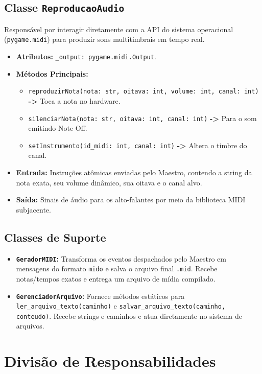 \documentclass[12pt, a4paper]{article}
\begin{document}
\subsection{Classe \texttt{ReproducaoAudio}}
Responsável por interagir diretamente com a API do sistema operacional (\texttt{pygame.midi}) para produzir sons multitimbrais em tempo real.
\begin{itemize}[leftmargin=2cm]
  \item \textbf{Atributos:} \texttt{\_output: pygame.midi.Output}.
  \item \textbf{Métodos Principais:}
    \begin{itemize}
      \item \texttt{reproduzirNota(nota: str, oitava: int, volume: int, canal: int)} \textbf{->} Toca a nota no hardware.
      \item \texttt{silenciarNota(nota: str, oitava: int, canal: int)} \textbf{->} Para o som emitindo Note Off.
      \item \texttt{setInstrumento(id\_midi: int, canal: int)} \textbf{->} Altera o timbre do canal.
    \end{itemize}
  \item \textbf{Entrada:} Instruções atômicas enviadas pelo Maestro, contendo a string da nota exata, seu volume dinâmico, sua oitava e o canal alvo.
  \item \textbf{Saída:} Sinais de áudio para os alto-falantes por meio da biblioteca MIDI subjacente.
\end{itemize}

\subsection{Classes de Suporte}
\begin{itemize}[leftmargin=2cm]
  \item \textbf{\texttt{GeradorMIDI}:} Transforma os eventos despachados pelo Maestro em mensagens do formato \texttt{mido} e salva o arquivo final \texttt{.mid}. Recebe notas/tempos exatos e entrega um arquivo de mídia compilado.
  \item \textbf{\texttt{GerenciadorArquivo}:} Fornece métodos estáticos para \texttt{ler\_arquivo\_texto(caminho)} e \texttt{salvar\_arquivo\_texto(caminho, conteudo)}. Recebe strings e caminhos e atua diretamente no sistema de arquivos.
\end{itemize}

\section{Divisão de Responsabilidades}
\end{document}
